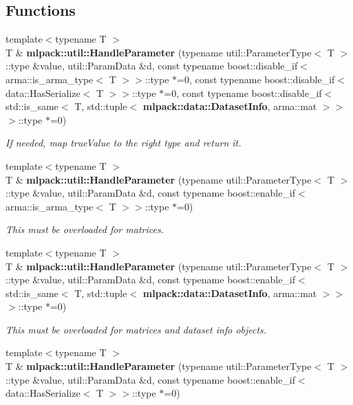 \subsection*{Functions}
\begin{DoxyCompactItemize}
\item 
{\footnotesize template$<$typename T $>$ }\\T \& {\bf mlpack\+::util\+::\+Handle\+Parameter} (typename util\+::\+Parameter\+Type$<$ T $>$\+::type \&value, util\+::\+Param\+Data \&d, const typename boost\+::disable\+\_\+if$<$ arma\+::is\+\_\+arma\+\_\+type$<$ T $>$$>$\+::type $\ast$=0, const typename boost\+::disable\+\_\+if$<$ data\+::\+Has\+Serialize$<$ T $>$$>$\+::type $\ast$=0, const typename boost\+::disable\+\_\+if$<$ std\+::is\+\_\+same$<$ T, std\+::tuple$<$ {\bf mlpack\+::data\+::\+Dataset\+Info}, arma\+::mat $>$$>$$>$\+::type $\ast$=0)
\begin{DoxyCompactList}\small\item\em If needed, map \textquotesingle{}true\+Value\textquotesingle{} to the right type and return it. \end{DoxyCompactList}\item 
{\footnotesize template$<$typename T $>$ }\\T \& {\bf mlpack\+::util\+::\+Handle\+Parameter} (typename util\+::\+Parameter\+Type$<$ T $>$\+::type \&value, util\+::\+Param\+Data \&d, const typename boost\+::enable\+\_\+if$<$ arma\+::is\+\_\+arma\+\_\+type$<$ T $>$$>$\+::type $\ast$=0)
\begin{DoxyCompactList}\small\item\em This must be overloaded for matrices. \end{DoxyCompactList}\item 
{\footnotesize template$<$typename T $>$ }\\T \& {\bf mlpack\+::util\+::\+Handle\+Parameter} (typename util\+::\+Parameter\+Type$<$ T $>$\+::type \&value, util\+::\+Param\+Data \&d, const typename boost\+::enable\+\_\+if$<$ std\+::is\+\_\+same$<$ T, std\+::tuple$<$ {\bf mlpack\+::data\+::\+Dataset\+Info}, arma\+::mat $>$$>$$>$\+::type $\ast$=0)
\begin{DoxyCompactList}\small\item\em This must be overloaded for matrices and dataset info objects. \end{DoxyCompactList}\item 
{\footnotesize template$<$typename T $>$ }\\T \& {\bf mlpack\+::util\+::\+Handle\+Parameter} (typename util\+::\+Parameter\+Type$<$ T $>$\+::type \&value, util\+::\+Param\+Data \&d, const typename boost\+::enable\+\_\+if$<$ data\+::\+Has\+Serialize$<$ T $>$$>$\+::type $\ast$=0)

\end{DoxyCompactItemize}
